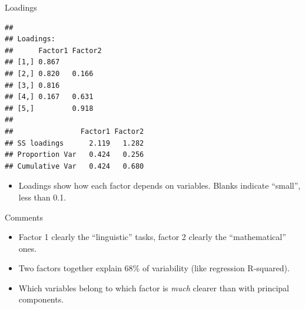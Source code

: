 \documentclass[
  ignorenonframetext,
]{beamer}
\newenvironment{Shaded}{\begin{snugshade}}{\end{snugshade}}
\newcommand{\NormalTok}[1]{#1}
\newcommand{\OperatorTok}[1]{\textcolor[rgb]{0.81,0.36,0.00}{\textbf{#1}}}
\providecommand{\tightlist}{%
  \setlength{\itemsep}{0pt}\setlength{\parskip}{0pt}}
\begin{document}
\begin{frame}[fragile]{Loadings}
\protect\hypertarget{loadings}{}

\footnotesize

\begin{Shaded}
\end{Shaded}

\begin{verbatim}
## 
## Loadings:
##      Factor1 Factor2
## [1,] 0.867          
## [2,] 0.820   0.166  
## [3,] 0.816          
## [4,] 0.167   0.631  
## [5,]         0.918  
## 
##                Factor1 Factor2
## SS loadings      2.119   1.282
## Proportion Var   0.424   0.256
## Cumulative Var   0.424   0.680
\end{verbatim}

\normalsize

\begin{itemize}
\tightlist
\item
  Loadings show how each factor depends on variables. Blanks indicate
  ``small'', less than 0.1.
\end{itemize}

\end{frame}

\begin{frame}{Comments}
\protect\hypertarget{comments-35}{}

\begin{itemize}
\item
  Factor 1 clearly the ``linguistic'' tasks, factor 2 clearly the
  ``mathematical'' ones.
\item
  Two factors together explain 68\% of variability (like regression
  R-squared).
\item
  Which variables belong to which factor is \emph{much} clearer than
  with principal components.
\end{itemize}

\end{frame}
\end{document}
